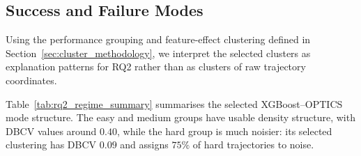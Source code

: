 \documentclass[12pt]{article}
\begin{document}
\subsection{Success and Failure Modes}
\label{sec:rq2_results}

Using the performance grouping and feature-effect clustering defined in Section~\ref{sec:cluster_methodology}, we interpret the selected clusters as explanation patterns for RQ2 rather than as clusters of raw trajectory coordinates.

Table~\ref{tab:rq2_regime_summary} summarises the selected XGBoost--OPTICS mode structure. The easy and medium groups have usable density structure, with DBCV values around $0.40$, while the hard group is much noisier: its selected clustering has DBCV $0.09$ and assigns $75\%$ of hard trajectories to noise.
\end{document}
